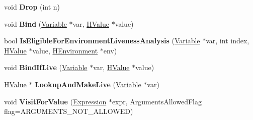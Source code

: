 \begin{DoxyCompactItemize}
\item 
void {\bfseries Drop} (int n)\hypertarget{classv8_1_1internal_1_1_h_optimized_graph_builder_ae0b590e99749e2483a78cb7616b29213}{}\label{classv8_1_1internal_1_1_h_optimized_graph_builder_ae0b590e99749e2483a78cb7616b29213}

\item 
void {\bfseries Bind} (\hyperlink{classv8_1_1internal_1_1_variable}{Variable} $\ast$var, \hyperlink{classv8_1_1internal_1_1_h_value}{H\+Value} $\ast$value)\hypertarget{classv8_1_1internal_1_1_h_optimized_graph_builder_af118784358a7d98ccabcd369625adfcc}{}\label{classv8_1_1internal_1_1_h_optimized_graph_builder_af118784358a7d98ccabcd369625adfcc}

\item 
bool {\bfseries Is\+Eligible\+For\+Environment\+Liveness\+Analysis} (\hyperlink{classv8_1_1internal_1_1_variable}{Variable} $\ast$var, int index, \hyperlink{classv8_1_1internal_1_1_h_value}{H\+Value} $\ast$value, \hyperlink{classv8_1_1internal_1_1_h_environment}{H\+Environment} $\ast$env)\hypertarget{classv8_1_1internal_1_1_h_optimized_graph_builder_a5782939a23ee3b9ddd83ff267a9c69c8}{}\label{classv8_1_1internal_1_1_h_optimized_graph_builder_a5782939a23ee3b9ddd83ff267a9c69c8}

\item 
void {\bfseries Bind\+If\+Live} (\hyperlink{classv8_1_1internal_1_1_variable}{Variable} $\ast$var, \hyperlink{classv8_1_1internal_1_1_h_value}{H\+Value} $\ast$value)\hypertarget{classv8_1_1internal_1_1_h_optimized_graph_builder_a7a976013440aefb89d4777bcd40910ed}{}\label{classv8_1_1internal_1_1_h_optimized_graph_builder_a7a976013440aefb89d4777bcd40910ed}

\item 
\hyperlink{classv8_1_1internal_1_1_h_value}{H\+Value} $\ast$ {\bfseries Lookup\+And\+Make\+Live} (\hyperlink{classv8_1_1internal_1_1_variable}{Variable} $\ast$var)\hypertarget{classv8_1_1internal_1_1_h_optimized_graph_builder_aadc60a5cf1a97a20010bbb1ab3511a20}{}\label{classv8_1_1internal_1_1_h_optimized_graph_builder_aadc60a5cf1a97a20010bbb1ab3511a20}

\item 
void {\bfseries Visit\+For\+Value} (\hyperlink{classv8_1_1internal_1_1_expression}{Expression} $\ast$expr, Arguments\+Allowed\+Flag flag=A\+R\+G\+U\+M\+E\+N\+T\+S\+\_\+\+N\+O\+T\+\_\+\+A\+L\+L\+O\+W\+ED)\hypertarget{classv8_1_1internal_1_1_h_optimized_graph_builder_ae8b3eed58ef6bcc740d9a7e47e35c15f}{}\label{classv8_1_1internal_1_1_h_optimized_graph_builder_ae8b3eed58ef6bcc740d9a7e47e35c15f}


\end{DoxyCompactItemize}
